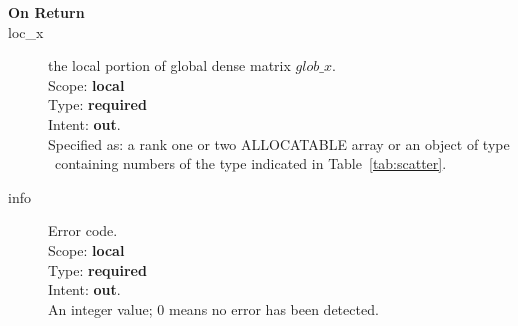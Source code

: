 \begin{description}
\item[\bf On Return] 
\item[loc\_x] the local portion of global dense matrix
$glob\_x$. \\
Scope: {\bf local} \\
Type: {\bf required}\\
Intent: {\bf out}.\\
Specified as: a rank one or two ALLOCATABLE array  or an object of type \vdata\ containing numbers of the type
indicated in Table~\ref{tab:scatter}.
\item[info] Error code.\\
Scope: {\bf local} \\
Type: {\bf required} \\
Intent: {\bf out}.\\
An integer value; 0 means no error has been detected. 
\end{description}

